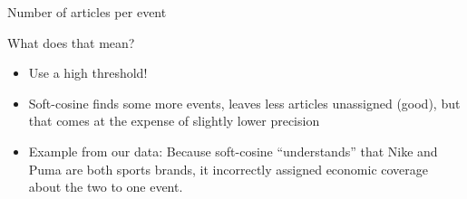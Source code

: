 \documentclass[compress]{beamer}
\begin{document}
\begin{frame}{Number of articles per event}
	
	\begin{table}[h]
		\caption{Descriptives for different threshold/similarity combinations\label{tab:thresholds}}
		
		\centering
	\end{table}
\end{frame}



\begin{frame}{What does that mean?}
	\begin{itemize}
		\item Use a high threshold!
		\item Soft-cosine finds some more events, leaves less articles unassigned (good), but that comes at the expense of slightly lower precision
		\item Example from our data: Because soft-cosine ``understands'' that Nike and Puma are both sports brands, it incorrectly assigned economic coverage about the two to one event.
	\end{itemize}
\end{frame}
\end{document}

